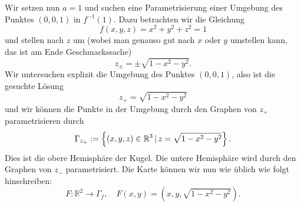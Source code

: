 \begin{Beispiel}
    Wir setzen nun $a=1$ und suchen eine Parametrisierung einer Umgebung des Punktes $(0,0,1)$ in $f^{-1}(1)$. Dazu betrachten wir die Gleichung
    \begin{equation*}
        f(x,y,z)=x^2+y^2+z^2=1
    \end{equation*}
    und stellen nach $z$ um (wobei man genauso gut nach $x$ oder $y$ umstellen kann, das ist am Ende Geschmackssache)
    \begin{equation*}
        z_\pm = \pm \sqrt{1-x^2-y^2}.
    \end{equation*}
    Wir untersuchen explizit die Umgebung des Punktes $(0,0,1)$, also ist die gesuchte Lösung
    \begin{equation*}
        z_+=\sqrt{1-x^2-y^2}
    \end{equation*}
    und wir können die Punkte in der Umgebung durch den Graphen von $z_+$ parametrisieren durch
    \begin{equation*}
        \Gamma_{z_+} := \left\{(x,y,z)\in\mathbb{R}^3\,|\, z=\sqrt{1-x^2-y^2}\right\}.
    \end{equation*}
    Dies ist die obere Hemisphäre der Kugel. Die untere Hemisphäre wird durch den Graphen von $z_-$ parametrisiert. Die Karte können wir nun wie üblich wie folgt hinschreiben:
    \begin{equation*}
        F: \mathbb{R}^2\rightarrow\Gamma_f, \quad F(x,y)=(x,y,\sqrt{1-x^2-y^2}).
    \end{equation*}
\end{Beispiel}
